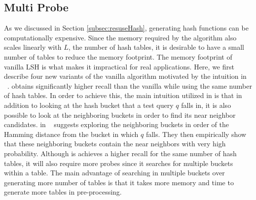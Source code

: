 \subsection{Multi Probe \lsh}
\label{sec:mblsh}
As we discussed in Section \ref{subsec:resuseHash}, generating hash functions can be computationally expensive.
Since the memory required by the algorithm also scales linearly with $L$, the number of hash tables, it is desirable to have a small 
number of tables to reduce the memory footprint. The memory footprint of vanilla LSH is what makes it impractical for real applications. 
Here, we first describe four new variants of the vanilla \lsh algorithm motivated by the intuition in
\mblshf~\cite{LvVLDB07}. \mblshf obtains significantly higher recall than the vanilla \lsh while using
the same number of hash tables. In order to achieve this, the main intuition utilized in \mblshf is that
in addition to looking at the hash bucket that a test query $q$ falls in, it is also possible to look at the neighboring buckets
in order to find its near neighbor candidates. \mblshf in ~\cite{LvVLDB07} suggests exploring the neighboring buckets in order of the
Hamming distance from the bucket in which $q$ falls. They then empirically show that these neighboring buckets contain 
the near neighbors with very high probability. 
Although \mblshf is achieves a higher recall for the same number of hash tables, it will also require more 
probes since it searches for multiple buckets within a table. 
The main advantage of searching in multiple buckets over generating more number of tables 
is that it takes more memory and time to generate more tables in pre-processing. 

